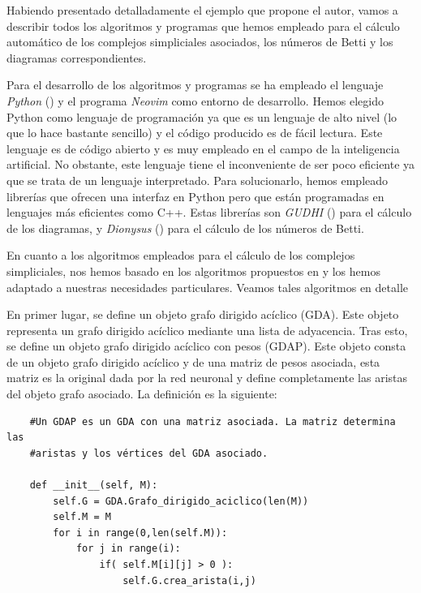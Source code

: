 \documentclass[12pt, a4paper, twoside]{book}
\numberwithin{equation}{section}
\theoremstyle{definition}
\theoremstyle{remark}
\theoremstyle{plain}
\begin{document}
	Habiendo presentado detalladamente el ejemplo que propone el autor, 
	vamos a describir todos los algoritmos y programas que hemos empleado
	para el cálculo automático de los complejos simpliciales asociados, 
	los números de Betti y los diagramas correspondientes.

	Para el desarrollo de los algoritmos y programas se ha empleado el 
	lenguaje \emph{Python} (\cite{10.5555/1593511}) y el programa 
	\emph{Neovim} como entorno de desarrollo. Hemos elegido Python como 
	lenguaje de programación ya que es un lenguaje de alto nivel (lo que 
	lo hace bastante sencillo) y el código producido es de fácil lectura. 
	Este lenguaje es de código abierto y es muy empleado en el campo de la 
	inteligencia artificial. No obstante, este lenguaje tiene el 
	inconveniente de ser poco eficiente ya que se trata de un lenguaje 
	interpretado. Para solucionarlo, hemos empleado librerías que ofrecen 
	una interfaz en Python pero que están programadas en lenguajes más 
	eficientes como C++. Estas librerías son \emph{GUDHI} 
	(\cite{gudhi:urm}) para el cálculo de los diagramas, y \emph{Dionysus} 
	(\cite{morozov_2021}) para el cálculo de los números de Betti.

	En cuanto a los algoritmos empleados para el cálculo de los complejos
	simpliciales, nos hemos basado en los algoritmos propuestos en 
	\cite{Algoritmos-Sedgewick} y los hemos adaptado a nuestras 
	necesidades particulares. Veamos tales algoritmos en detalle

	En primer lugar, se define un objeto grafo dirigido acíclico (GDA). 
	Este objeto representa un grafo dirigido acíclico mediante una lista 
	de adyacencia. Tras esto, se define un objeto grafo dirigido acíclico 
	con pesos (GDAP). Este objeto consta de un objeto grafo dirigido 
	acíclico y de una matriz de pesos asociada, esta matriz es la original 
	dada por la red neuronal y define completamente las aristas del objeto 
	grafo asociado. La definición es la siguiente:

	\begin{verbatim}
	#Un GDAP es un GDA con una matriz asociada. La matriz determina las 
	#aristas y los vértices del GDA asociado.
    	
	def __init__(self, M):
        self.G = GDA.Grafo_dirigido_aciclico(len(M))
        self.M = M
        for i in range(0,len(self.M)):
            for j in range(i):
                if( self.M[i][j] > 0 ):
                    self.G.crea_arista(i,j)
	\end{verbatim}
\end{document}
